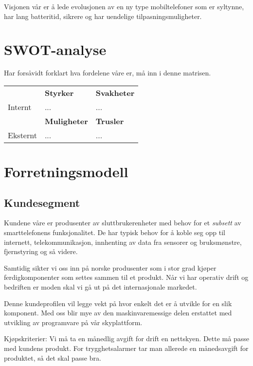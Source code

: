 Visjonen vår er å lede evolusjonen av en ny type mobiltelefoner som er
syltynne, har lang batteritid, sikrere og har uendelige tilpasningsmuligheter.

\section{SWOT-analyse}

Har forsåvidt forklart hva fordelene våre er, må inn i denne matrisen.

\begin{table}[h]
  \begin{tabular}{lll}
  & \textbf{Styrker}
  & \textbf{Svakheter} \\
  Internt
  & ...
  & ...
  \\
  & \textbf{Muligheter}
  & \textbf{Trusler} \\
  Eksternt
  & ...
  & ...
  \\
  \end{tabular}
\end{table}

\section{Forretningsmodell}

\subsection{Kundesegment}

Kundene våre er produsenter av sluttbrukerenheter med behov for et
\textit{subsett} av smarttelefonens funksjonalitet. De har typisk behov for å
koble seg opp til internett, telekommunikasjon, innhenting av data fra sensorer
og bruksmønstre, fjernstyring og så videre.

Samtidig sikter vi oss inn på norske produsenter som i stor grad kjøper
ferdigkomponenter som settes sammen til et produkt.  Når vi har operativ drift
og bedriften er moden skal vi gå ut på det internasjonale markedet.

Denne kundeprofilen vil legge vekt på hvor enkelt det er å utvikle for en slik
komponent. Med oss blir mye av den maskinvaremessige delen erstattet med
utvikling av programvare på vår skyplattform.

Kjøpskriterier: Vi må ta en månedlig avgift for drift en nettskyen. Dette må
passe med kundens produkt. For trygghetsalarmer tar man allerede en
månedsavgift for produktet, så det skal passe bra.

